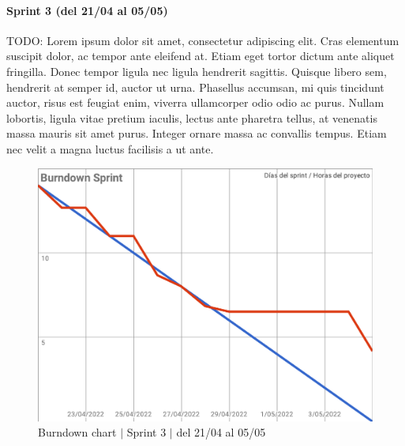 \paragraph{Sprint 3 (del 21/04 al 05/05)}
TODO: Lorem ipsum dolor sit amet, consectetur adipiscing elit. Cras elementum suscipit dolor, ac tempor ante eleifend at. Etiam eget tortor dictum ante aliquet fringilla. Donec tempor ligula nec ligula hendrerit sagittis. Quisque libero sem, hendrerit at semper id, auctor ut urna. Phasellus accumsan, mi quis tincidunt auctor, risus est feugiat enim, viverra ullamcorper odio odio ac purus. Nullam lobortis, ligula vitae pretium iaculis, lectus ante pharetra tellus, at venenatis massa mauris sit amet purus. Integer ornare massa ac convallis tempus. Etiam nec velit a magna luctus facilisis a ut ante.
\begin{figure}[H]
    \centering
    \includegraphics[width=1\linewidth]{text/image/BurndownChart3.pdf}
    \caption{Burndown chart $|$ Sprint 3 $|$ del 21/04 al 05/05}
    \label{fig:burndown_chart_3}
\end{figure}

\newpage
